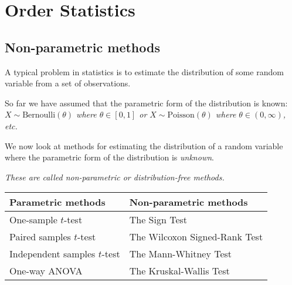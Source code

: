 \chapter{Order Statistics}\label{chap:order-statistics}
\setcounter{page}{1}
\startcontents[chapters]
\chapcontents

\section{Non-parametric methods}

A typical problem in statistics is to estimate the distribution of some random variable from a set of observations. 

\vspace*{2ex}
So far we have assumed that the parametric form of the distribution is known:
\bit
\it $X\sim\text{Bernoulli}(\theta)$ where $\theta\in [0,1]$ or $X\sim\text{Poisson}(\theta)$ where $\theta\in(0,\infty)$, etc.
\eit

\vspace*{2ex}
We now look at methods for estimating the distribution of a random variable where the parametric form of the distribution is \emph{unknown}.

\bit
\it These are called \emph{non-parametric} or \emph{distribution-free} methods.
\eit

\vfill
\begin{minipage}{\linewidth}
\centering
\begin{tabular}{|l||l|}\hline
Parametric methods				& Non-parametric methods \\ \hline\hline
One-sample $t$-test				& The Sign Test \\
Paired samples $t$-test			& The Wilcoxon Signed-Rank Test \\ \hline
Independent samples $t$-test		& The Mann-Whitney Test \\ \hline
One-way ANOVA					& The Kruskal-Wallis Test \\ \hline
\end{tabular}
\end{minipage}

